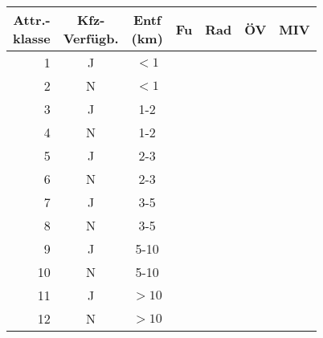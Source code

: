 \documentclass[a4paper]{foils}
\begin{document}
\begin{center}
{\small
\begin{tabular}{|r||c|c||r|r|r|r|}
\hline 
 \myBox{2em}{Attr.-\\[-1.5em]klasse} &
  \myBox{3em}{Kfz-\\Verf\"ugb.} &
  \myBox{3em}{Entf\\ (km)} &
  Fu\3 & Rad & \"OV  & MIV \\ \hline\hline
1  & J &$<1$  & & & & \\[0.5em] \hline
2  & N &$<1$  & & & & \\[0.5em] \hline
3  & J & 1-2  & & & & \\[0.5em] \hline
4  & N & 1-2  & & & & \\[0.5em] \hline
5  & J & 2-3  & & & & \\[0.5em] \hline
6  & N & 2-3  & & & & \\[0.5em] \hline
7  & J & 3-5  & & & & \\[0.5em] \hline
8  & N & 3-5  & & & & \\[0.5em] \hline
9  & J & 5-10  & & & & \\[0.5em] \hline
10  & N & 5-10  & & & & \\[0.5em] \hline
11  & J & $>10$  & & & & \\[0.5em] \hline
12 & N & $>10$  & & & & \\[0.5em] \hline
\end{tabular}
}

\end{center}
\end{document}
